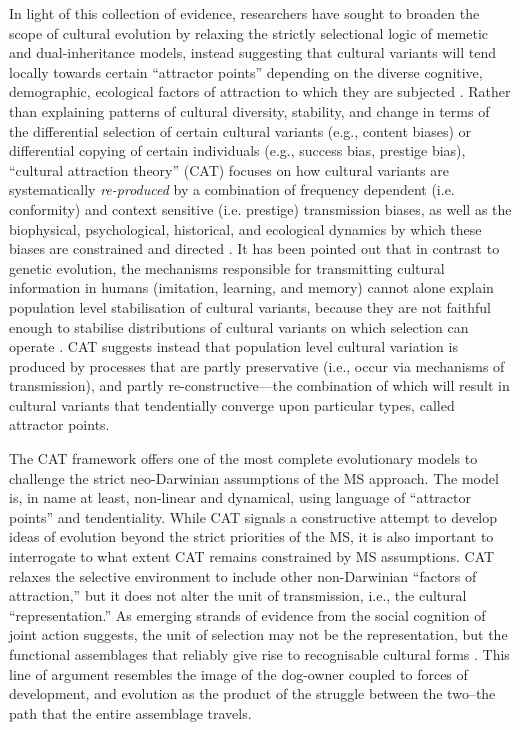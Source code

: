 In light of this collection of evidence, researchers have sought to broaden the scope of cultural evolution by relaxing the strictly selectional logic of memetic and dual-inheritance models, instead suggesting that cultural variants will tend locally towards certain ``attractor points'' depending on the diverse cognitive, demographic, ecological factors of attraction to which they are subjected \citep{Sperber1996}.  Rather than explaining patterns of cultural diversity, stability, and change in terms of the differential selection of certain cultural variants (e.g., content biases) or differential copying of certain individuals (e.g., success bias, prestige bias),  ``cultural attraction theory'' (CAT) focuses on how cultural variants are systematically \textit{re-produced} by a combination of frequency dependent (i.e. conformity) and context sensitive (i.e. prestige) transmission biases, as well as the biophysical, psychological, historical, and ecological dynamics by which these biases are constrained and directed \citep{Claidiere2014}.  It has been pointed out that in contrast to genetic evolution, the mechanisms responsible for transmitting cultural information in humans (imitation, learning, and memory) cannot alone explain population level stabilisation of cultural variants, because they are not faithful enough to stabilise distributions of cultural variants on which selection can operate \cite{Claidiere2014}. CAT suggests instead that population level cultural variation is produced by processes that are partly preservative (i.e., occur via mechanisms of transmission), and partly re-constructive---the combination of which will result in cultural variants that tendentially converge upon particular types, called attractor points.

The CAT framework offers one of the most complete evolutionary models to challenge the strict neo-Darwinian assumptions of the MS approach.  The model is, in name at least, non-linear and dynamical, using language of ``attractor points'' and tendentiality.  While CAT signals a constructive attempt to develop ideas of evolution beyond the strict priorities of the MS, it is also important to interrogate to what extent CAT remains constrained by MS assumptions.  CAT relaxes the selective environment to include other non-Darwinian ``factors of attraction,'' but it does not alter the unit of transmission, i.e., the cultural ``representation.''  As emerging strands of evidence from the social cognition of joint action suggests, the unit of selection may not be the representation, but the functional assemblages that reliably give rise to recognisable cultural forms \citep{Kelso2016,Yufik2013,Corning2013,Nowak2017}.  This line of argument resembles the image of the dog-owner coupled to forces of development, and evolution as the product of the struggle between the two--the path that the entire assemblage travels.


